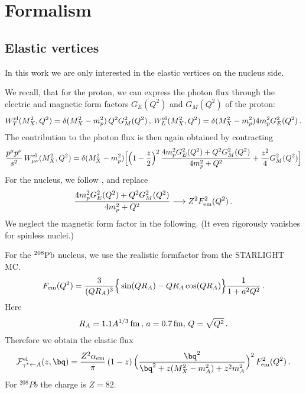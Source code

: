 \section{Formalism}

\subsection{Elastic vertices}
In this work we are only interested in the elastic vertices on the nucleus side.

We recall, that for the proton, we can express the photon flux through
the electric and magnetic form factors $G_E(Q^2)$ and $G_M(Q^2)$ of the proton:
\begin{eqnarray}
W^{\rm el}_T(M_X^2,Q^2) = \delta(M_X^2 - m_p^2) \, Q^2 G^2_M(Q^2) \, , \, W^{\rm el}_L(M_X^2, Q^2) = \delta(M_X^2 - m_p^2) 4m_p^2 G^2_E(Q^2) \, . 
\end{eqnarray}
The contribution to the photon flux is then again obtained by contracting
\begin{eqnarray}
  {p^\mu p^\nu \over s^2} \, W^{\rm el}_{\mu \nu}(M_X^2,Q^2) = \delta(M_X^2 - m_p^2) 
\Big[ \Big( 1- {z \over 2} \Big)^2 \, {4 m_p^2 G_E^2(Q^2) + Q^2 G_M^2(Q^2) \over 4m_p^2 + Q^2} + {z^2 \over 4} G_M^2(Q^2) \Big]
\nonumber \\
\end{eqnarray}
For the nucleus, we follow \cite{Budnev:1974de}, and replace 
\begin{eqnarray}
 {4 m_p^2 G_E^2(Q^2) + Q^2 G_M^2(Q^2) \over 4m_p^2 + Q^2} \longrightarrow Z^2 F_{\rm em}^2(Q^2) \, .
 \end{eqnarray}
We neglect the magnetic form factor in the following. (It even rigorously vanishes for spinless nuclei.)

For the $^{208}\rm{Pb}$ nucleus, we use the realistic formfactor from the STARLIGHT MC.
\begin{eqnarray}
 F_{\rm em}(Q^2) = {3 \over (QR_A)^3}\Big\{ \sin(QR_A) - QR_A \cos(QR_A) \Big\} { 1 \over 1 + a^2 Q^2} \, .
\end{eqnarray}
Here 
\begin{eqnarray}
R_A = 1.1 A^{1/3} \, {\rm fm} \, , \, a = 0.7 \, {\rm fm}, \, Q = \sqrt{Q^2} \,  .
\end{eqnarray}
Therefore we obtain the elastic flux
\begin{eqnarray}
{\cal{F}}^{{\rm{el}}}_{\gamma^* \leftarrow A} (z,\bq) = {Z^2 \alpha_{\rm{em}}\over \pi}  \, (1-z) \, 
\Big( {\bq^2 \over \bq^2 + z (M_X^2 - m_A^2) + z^2 m_A^2  }\Big)^2 \, F^2_{\rm em}(Q^2)
\, . \nonumber \\
\end{eqnarray}
For $^{208}Pb$ the charge is $Z=82$.

